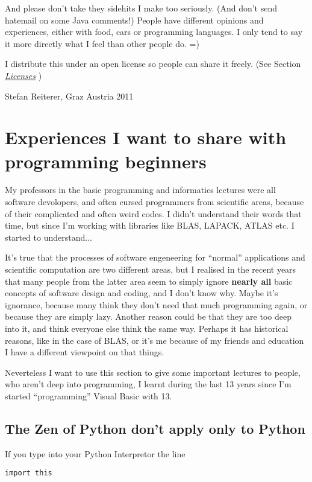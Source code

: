 \documentclass[letterpaper,10pt,english]{manual}
\begin{document}
And please don't take they sidehits I make too seriously.  (And don't send hatemail on some Java comments!)
People have different opinions and experiences, either with food, cars or programming languages. I only tend to say it more
directly what I feel than other people do. =)

I distribute this under an open license so people can share it
freely. (See Section \hyperlink{license-ref}{\emph{Licenses}} )

Stefan Reiterer,
Graz Austria
2011


\section{Experiences I want to share with programming beginners}

My professors in the basic programming and informatics lectures were all software devolopers, and often cursed programmers from scientific areas,
because of their complicated and often weird codes. I didn't understand their words that time, but since I'm working with libraries like
BLAS, LAPACK, ATLAS etc. I started to understand...

It's true that the processes of software engeneering for ``normal'' applications and scientific computation are two different areas, but I realised in the recent
years that many people from the latter area seem to simply ignore \textbf{nearly all} basic concepts of software design and coding, and I don't know why.
Maybe it's ignorance, because many think they don't need that much programming again, or because they are simply lazy. Another reason could be
that they are too deep into it, and think everyone else think the same way. Perhaps it has historical reasons, like in the case of BLAS,
or it's me because of my friends and education I have a different viewpoint on  that things.

Neverteless I want to use this section to give some important lectures to people, who aren't deep into programming,
I learnt during the last 13 years since I'm started ``programming'' Visual Basic with 13.


\subsection{The Zen of Python don't apply only to Python}

If you type into your Python Interpretor the line

\begin{Verbatim}[commandchars=\\\{\}]
import this
\end{Verbatim}
\end{document}
